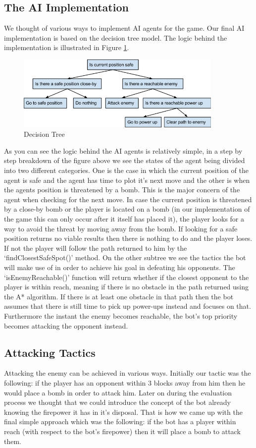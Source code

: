 \subsection{The AI Implementation}
We thought of various ways to implement AI agents for the game. Our final AI implementation is based on the decision tree model. The logic behind the implementation is illustrated in Figure \ref{fig:tree1}.

\begin{figure}
\centering
\includegraphics[width=10cm]{resources/tree1}
\caption{Decision Tree}
\label{fig:tree1}
\end{figure}

As you can see the logic behind the AI agents is relatively simple, in a step by step breakdown of the figure above we see the states of the agent being divided into two different categories. One is the case in which the current position of the agent is safe and the agent has time to plot it’s  next move and the other is when the agents position is threatened by a bomb. This is the major concern of the agent when checking for the next move. 
In case the current position is threatened by a close-by bomb or the player is located on a bomb (in our implementation of the game this can only occur after it itself has placed it), the player looks for a way to avoid the threat by moving away from the bomb. If looking for a safe position returns no viable results then there is nothing to do and the player loses. If not the player will follow the path returned to him by the ‘findClosestSafeSpot()’ method.
On the other subtree we see the tactics the bot will make use of in order to achieve his goal in defeating his opponents. The ‘isEnemyReachable()’ function will return whether if the closest opponent to the player is within reach, meaning if there is no obstacle in the path returned using the A* algorithm. If there is at least one obstacle in that path then the bot assumes that there is still time to pick up power-ups instead and focuses on that. Furthermore the instant the enemy becomes reachable, the bot’s top priority becomes attacking the opponent instead.


\subsection{Attacking Tactics}
Attacking the enemy can be achieved in various ways. Initially our tactic was the following: if the player has an opponent within 3 blocks away from him then he would place a bomb in order to attack him. Later on during the evaluation process we thought that we could introduce the concept of the bot already knowing the firepower it has in it’s disposal. That is how we came up with the final simple approach which was the following: if the bot has a player within reach (with respect to the bot’s firepower) then it will place a bomb to attack them.

